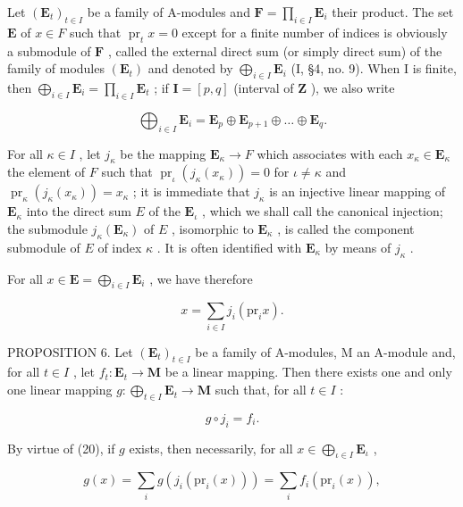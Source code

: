 Let \((\mathbf{E}_t)_{t \in I}\) be a family of A-modules and \(\mathbf{F} = \prod_{i \in I} \mathbf{E}_i\) their product. The set \(\mathbf{E}\) of \(x \in F\) such that \(\operatorname{pr}_t x = 0\) except for a finite number of indices is obviously a submodule of \(\mathbf{F}\) , called the external direct sum (or simply direct sum) of the family of modules \((\mathbf{E}_t)\) and denoted by \(\bigoplus_{i \in I} \mathbf{E}_i\) (I, §4, no. 9). When I is finite, then \(\bigoplus_{i \in I} \mathbf{E}_i = \prod_{i \in I} \mathbf{E}_t\) ; if \(\mathbf{I} = [p, q]\) (interval of \(\mathbf{Z}\) ), we also write

\[
\bigoplus_ {i \in I} \mathbf {E} _ {i} = \mathbf {E} _ {p} \oplus \mathbf {E} _ {p + 1} \oplus \dots \oplus \mathbf {E} _ {q}.
\]

For all \(\kappa \in I\) , let \(j_{\kappa}\) be the mapping \(\mathbf{E}_{\kappa} \to F\) which associates with each \(x_{\kappa} \in \mathbf{E}_{\kappa}\) the element of \(F\) such that \(\operatorname{pr}_{\iota}(j_{\kappa}(x_{\kappa})) = 0\) for \(\iota \neq \kappa\) and \(\operatorname{pr}_{\kappa}(j_{\kappa}(x_{\kappa})) = x_{\kappa}\) ; it is immediate that \(j_{\kappa}\) is an injective linear mapping of \(\mathbf{E}_{\kappa}\) into the direct sum \(E\) of the \(\mathbf{E}_{\iota}\) , which we shall call the canonical injection; the submodule \(j_{\kappa}(\mathbf{E}_{\kappa})\) of \(E\) , isomorphic to \(\mathbf{E}_{\kappa}\) , is called the component submodule of \(E\) of index \(\kappa\) . It is often identified with \(\mathbf{E}_{\kappa}\) by means of \(j_{\kappa}\) .

For all \(x \in \mathbf{E} = \bigoplus_{i \in I} \mathbf{E}_i\) , we have therefore

\[
x = \sum_ {i \in I} j _ {i} (\mathrm{pr} _ {i} x).\tag{20}
\]

PROPOSITION 6. Let \((\mathbf{E}_t)_{t \in I}\) be a family of A-modules, M an A-module and, for all \(t \in I\) , let \(f_t: \mathbf{E}_t \to \mathbf{M}\) be a linear mapping. Then there exists one and only one linear mapping \(g: \bigoplus_{t \in I} \mathbf{E}_t \to \mathbf{M}\) such that, for all \(t \in I\) :

\[
g \circ j _ {i} = f _ {i}.\tag{21}
\]

By virtue of (20), if \(g\) exists, then necessarily, for all \(x \in \bigoplus_{\iota \in I} \mathbf{E}_{\iota}\) ,

\[
g (x) = \sum_ {i} g (j _ {i} (\mathrm{pr} _ {i} (x))) = \sum_ {i} f _ {i} (\mathrm{pr} _ {i} (x)),
\]

